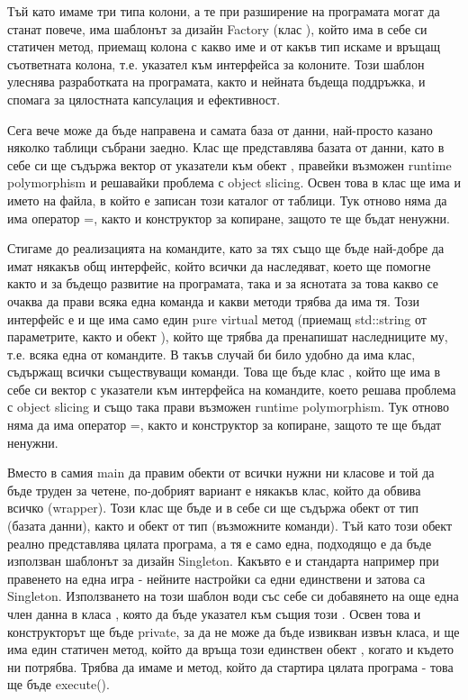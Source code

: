 Тъй като имаме три типа колони, а те при разширение на програмата могат да станат повече, има шаблонът за дизайн Factory (клас ), който има в себе си статичен метод, приемащ колона с какво име и от какъв тип искаме и връщащ съответната колона, т.\+е. указател към интерфейса за колоните. Този шаблон улеснява разработката на програмата, както и нейната бъдеща поддръжка, и спомага за цялостната капсулация и ефективност.

Сега вече може да бъде направена и самата база от данни, най-\/просто казано няколко таблици събрани заедно. Клас  ще представлява базата от данни, като в себе си ще съдържа вектор от указатели към обект , правейки възможен runtime polymorphism и решавайки проблема с object slicing. Освен това в клас  ще има и името на файла, в който е записан този каталог от таблици. Тук отново няма да има оператор =, както и конструктор за копиране, защото те ще бъдат ненужни.

Стигаме до реализацията на командите, като за тях също ще бъде най-\/добре да имат някакъв общ интерфейс, който всички да наследяват, което ще помогне както и за бъдещо развитие на програмата, така и за яснотата за това какво се очаква да прави всяка една команда и какви методи трябва да има тя. Този интерфейс е  и ще има само един pure virtual метод (приемащ std\+::string от параметрите, както и обект ), който ще трябва да пренапишат наследниците му, т.\+е. всяка една от командите. В такъв случай би било удобно да има клас, съдържащ всички съществуващи команди. Това ще бъде клас , който ще има в себе си вектор с указатели към интерфейса на командите, което решава проблема с object slicing и също така прави възможен runtime polymorphism. Тук отново няма да има оператор =, както и конструктор за копиране, защото те ще бъдат ненужни.

Вместо в самия main да правим обекти от всички нужни ни класове и той да бъде труден за четене, по-\/добрият вариант е някакъв клас, който да обвива всичко (wrapper). Този клас ще бъде  и в себе си ще съдържа обект от тип  (базата данни), както и обект от тип  (възможните команди). Тъй като този обект реално представлява цялата програма, а тя е само една, подходящо е да бъде използван шаблонът за дизайн Singleton. Какъвто е и стандарта например при правенето на една игра -\/ нейните настройки са едни единствени и затова са Singleton. Използването на този шаблон води със себе си добавянето на още една член данна в класа , която да бъде указател към същия този . Освен това и конструкторът ще бъде private, за да не може да бъде извикван извън класа, и ще има един статичен метод, който да връща този единствен обект , когато и където ни потрябва. Трябва да имаме и метод, който да стартира цялата програма -\/ това ще бъде execute().

